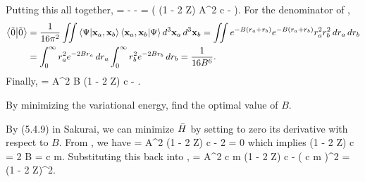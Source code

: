 \begin{solution}
	Putting this all together,
	\beq
		 =  -  - 
		=  \left( (1 - 2 Z) A^2 \alp \hbar c -  \right).
	\eeq
	For the denominator of ,
	\begin{align*}
		\braket{\tilde{0}} &= \frac{1}{16 \pi^2} \iint \braket{\Psi}{\vb{x}_a, \vb{x}_b} \braket{\vb{x}_a, \vb{x}_b}{\Psi} \dd[3]{\vb{x}_a} \dd[3]{\vb{x}_b}
		= \iint e^{-B(r_a + r_b)} e^{-B(r_a + r_b)} r_a^2 r_b^2 \dd{r_a} \dd{r_b} \\
		&= \int_0^\infty r_a^2 e^{-2B r_a} \dd{r_a} \int_0^\infty r_b^2 e^{-2B r_b} \dd{r_b}
		= \frac{1}{16 B^6}.
	\end{align*}
	Finally,
	\beqn \label{Hsol}
		\Hbar = A^2 B (1 - 2 Z) \alp \hbar c - .
	\eeqn
\end{solution}



\begin{problem}
	By minimizing the variational energy, find the optimal value of $B$.
\end{problem}

\begin{solution}
	By (5.4.9) in Sakurai, we can minimize $\bar{H}$ by setting to zero its derivative with respect to $B$.  From , we have
	\beq
		 = A^2 (1 - 2 Z) \alp \hbar c - 2  = 0
	\eeq
	which implies
	\beq
		(1 - 2 Z) \alp c = 2 
		\implies
		B =  \alp c m.
	\eeq
	Substituting this back into ,
	\beq
		\Hbar = A^2  \alp c m (1 - 2 Z) \alp \hbar c -  \left(  \alp c m \right)^2
		=  (1 - 2 Z)^2.
	\eeq
\end{solution}
\vfix